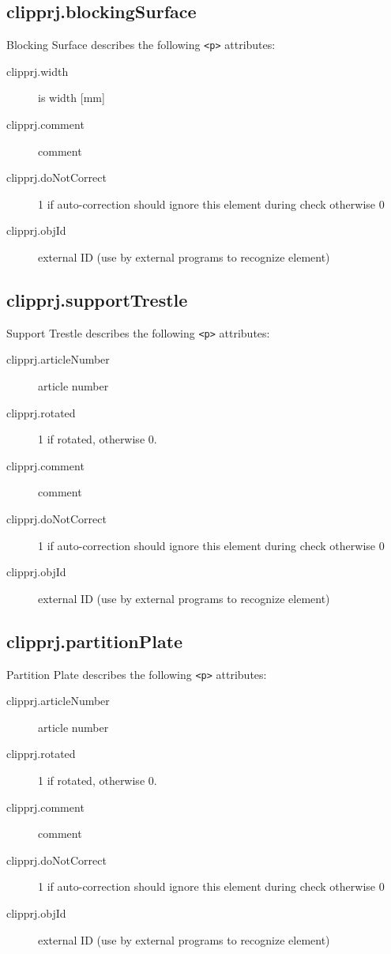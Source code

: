 \documentclass[%
	a4paper,
	oneside,
	listof=numbered,
	parskip=half,
	headsepline=true,
	footsepline=false,
	normalheadings,
	0.7headlines,
	headexclude,
	]{scrbook}
\begin{document}
\subsection{clipprj.blockingSurface}
 
Blocking Surface describes the following \verb|<p>| attributes: 

\begin{description}
	\item[clipprj.width] is width [mm] 
	\item[clipprj.comment] comment 
	\item[clipprj.doNotCorrect] 1 if auto-correction should ignore this element during check otherwise 0 
	\item[clipprj.objId] external ID (use by external programs to recognize element) 
\end{description}

\subsection{clipprj.supportTrestle}
 
Support Trestle describes the following \verb|<p>| attributes: 

\begin{description}
	\item[clipprj.articleNumber] article number 
	\item[clipprj.rotated] 1 if rotated, otherwise 0. 
	\item[clipprj.comment] comment 
	\item[clipprj.doNotCorrect] 1 if auto-correction should ignore this element during check otherwise 0 
	\item[clipprj.objId] external ID (use by external programs to recognize element) 
\end{description}

\subsection{clipprj.partitionPlate}
 
Partition Plate describes the following \verb|<p>| attributes: 

\begin{description}
	\item[clipprj.articleNumber] article number 
	\item[clipprj.rotated] 1 if rotated, otherwise 0. 
	\item[clipprj.comment] comment 
	\item[clipprj.doNotCorrect] 1 if auto-correction should ignore this element during check otherwise 0 
	\item[clipprj.objId] external ID (use by external programs to recognize element) 
\end{description}
\end{document}

